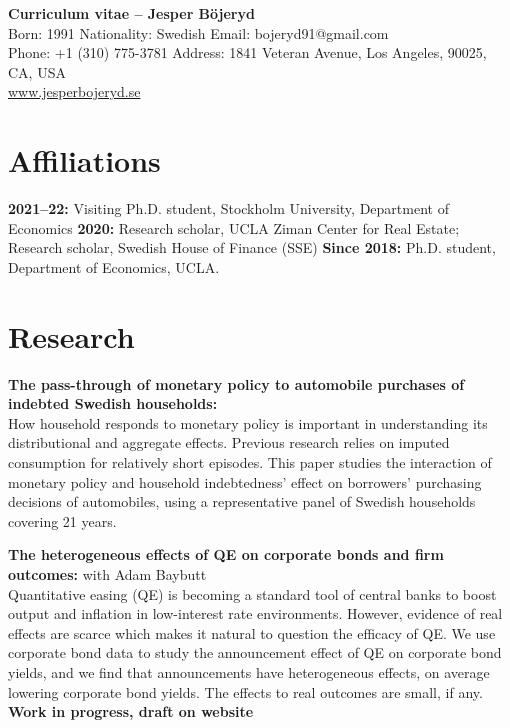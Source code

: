 \documentclass[letterpaper,10pt]{article}
\newcommand{\bold}[1]{\ifhmode\hspace{6pt}\fi\textbf{#1:}}
\begin{document}
\begin{center}
{\Large \textbf{Curriculum vitae -- Jesper Böjeryd}}\\[3pt]
Born: 1991 \hspace{6pt} Nationality: Swedish \hspace{6pt} Email: bojeryd91@gmail.com \\
Phone: +1 (310) 775-3781 \hspace{6pt} Address: 1841 Veteran Avenue, Los Angeles, 90025, CA, USA \\
\url{www.jesperbojeryd.se}
\end{center}

\section*{Affiliations}
\bold{2021--22} Visiting Ph.D. student, Stockholm University, Department of Economics \bold{2020} Research scholar, UCLA Ziman Center for Real Estate; Research scholar, Swedish House of Finance (SSE) \bold{Since 2018} Ph.D. student, Department of Economics, UCLA.

\section*{Research}
\bold{The pass-through of monetary policy to automobile purchases of indebted Swedish households}\\
How household responds to monetary policy is important in understanding its distributional and aggregate effects. Previous research relies on imputed consumption for relatively short episodes. This paper studies the interaction of monetary policy and household indebtedness' effect on borrowers' purchasing decisions of automobiles, using a representative panel of Swedish households covering 21 years. %

\bold{The heterogeneous effects of QE on corporate bonds and firm outcomes} with Adam Baybutt\\
Quantitative easing (QE) is becoming a standard tool of central banks to boost output and inflation in low-interest rate environments. However, evidence of real effects are scarce which makes it natural to question the efficacy of QE. We use corporate bond data to study the announcement effect of QE on corporate bond yields, and we find that announcements have heterogeneous effects, on average lowering corporate bond yields. The effects to real outcomes are small, if any. \textbf{Work in progress, draft on website}
\end{document}
